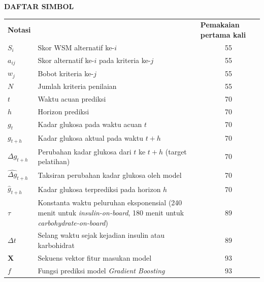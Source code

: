 \cleardoublepage
\vspace{2cm}
\begin{center}
{\fontsize{14}{16.8}\selectfont\textbf{DAFTAR SIMBOL}}\\[1em]
\end{center}
\label{chap:simbol}
\setcounter{chapter}{0}
\setcounter{section}{0}
\vspace{2em}


\begin{longtable}{@{} l >{\raggedright\arraybackslash}p{9cm} c @{}}
\multicolumn{1}{l}{\textbf{Notasi}} & \multicolumn{1}{l}{\textbf{Deskripsi}} & \multicolumn{1}{l}{\parbox[c]{2.5cm}{\raggedright \textbf{Pemakaian pertama kali}}} \\[0.5em]

$S_i$ & Skor WSM alternatif ke-$i$ & 55 \\
$a_{ij}$ & Skor alternatif ke-$i$ pada kriteria ke-$j$ & 55 \\
$w_j$ & Bobot kriteria ke-$j$ & 55 \\
$N$ & Jumlah kriteria penilaian & 55 \\[1ex]

$t$ & Waktu acuan prediksi & 70 \\
$h$ & Horizon prediksi & 70 \\
$g_t$ & Kadar glukosa pada waktu acuan $t$ & 70 \\
$g_{t+h}$ & Kadar glukosa aktual pada waktu $t+h$ & 70 \\
$\Delta g_{t+h}$ & Perubahan kadar glukosa dari $t$ ke $t+h$ (target pelatihan) & 70 \\
$\widehat{\Delta g}_{t+h}$ & Taksiran perubahan kadar glukosa oleh model & 70 \\
$\hat{g}_{t+h}$ & Kadar glukosa terprediksi pada horizon $h$ & 70 \\
$\tau$ & Konstanta waktu peluruhan eksponensial (240 menit untuk \emph{insulin-on-board}, 180 menit untuk \emph{carbohydrate-on-board}) & 89 \\
$\Delta t$ & Selang waktu sejak kejadian insulin atau karbohidrat & 89 \\
$\mathbf{X}$ & Sekuens vektor fitur masukan model & 93 \\
$f$ & Fungsi prediksi model \emph{Gradient Boosting} & 93 \\[1ex]


\end{longtable}
